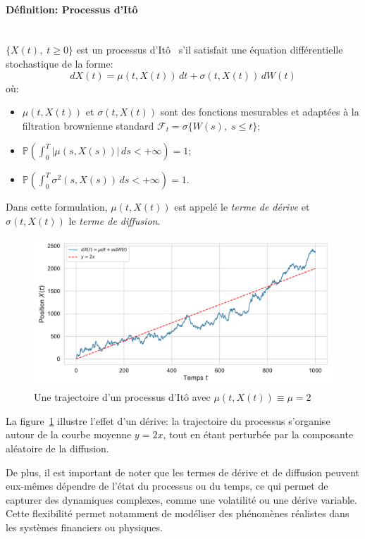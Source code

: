 \paragraph{Définition: Processus d'Itô}\mbox{}\\
$\{X(t),\;t \geq 0\}$ est un processus d'Itô~\cite{ito1944} s'il satisfait une équation différentielle stochastique de la forme:
\begin{equation}
    dX(t) = \mu(t, X(t))\,dt + \sigma(t, X(t))\,dW(t)
\end{equation}\label{ito_eq}
où:
\begin{itemize}
    \item $\mu(t, X(t))$ et $\sigma(t, X(t))$ sont des fonctions mesurables et adaptées à la filtration brownienne standard $\mathcal{F}_t=\sigma\{W(s),\;s\leq t\}$;
    \item $\mathds{P}\left( \int_0^T |\mu(s, X(s))|\,ds < +\infty \right) = 1$;
    \item $\mathds{P}\left( \int_0^T \sigma^2(s, X(s))\,ds < +\infty \right) = 1$.
\end{itemize}
Dans cette formulation, $\mu(t, X(t))$ est appelé le \textit{terme de dérive} et $\sigma(t, X(t))$ le \textit{terme de diffusion}.
\begin{figure}[htb]
    \centering
    \includegraphics[width=0.9\linewidth]{img/intro/path_drift.pdf}
    \caption{Une trajectoire d'un processus d'Itô avec $\mu(t, X(t)) \equiv \mu = 2$}\label{fig:TrajIto}
\end{figure}
\FloatBarrier La figure~\ref{fig:TrajIto} illustre l'effet d'un dérive: la trajectoire du processus s'organise autour de la courbe moyenne \( y = 2x \), tout en étant perturbée par la composante aléatoire de la diffusion.

De plus, il est important de noter que les termes de dérive et de diffusion peuvent eux-mêmes dépendre de l'état du processus ou du temps, ce qui permet de capturer des dynamiques complexes, comme une volatilité ou une dérive variable. Cette flexibilité permet notamment de modéliser des phénomènes réalistes dans les systèmes financiers ou physiques.


